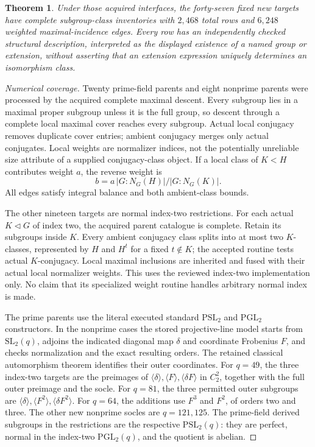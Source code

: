 \documentclass[11pt]{article}
\newtheorem{theorem}{Theorem}\newtheorem{lemma}{Lemma}
\begin{document}
\begin{theorem}
Under those acquired interfaces, the forty-seven fixed new targets have
complete subgroup-class inventories with $2,468$ total rows and $6,248$
weighted maximal-incidence edges. Every row has an independently checked
structural description, interpreted as the displayed existence of a
named group or extension, without asserting that an extension expression
uniquely determines an isomorphism class.
\end{theorem}
\begin{proof}[Numerical coverage]
Twenty prime-field parents and eight nonprime parents were processed by
the acquired complete maximal descent. Every subgroup lies in a maximal
proper subgroup unless it is the full group, so descent through a complete
local maximal cover reaches every subgroup. Actual local conjugacy
removes duplicate cover entries; ambient conjugacy merges only actual
conjugates. Local weights are normalizer indices, not the potentially
unreliable size attribute of a supplied conjugacy-class object. If a local
class of $K<H$ contributes weight $a$, the reverse weight is
\[
 b=a\,|G:N_G(H)|/|G:N_G(K)|.
\]
All edges satisfy integral balance and both ambient-class bounds.

The other nineteen targets are normal index-two restrictions. For each
actual $K\lhd G$ of index two, the acquired parent catalogue is complete.
Retain its subgroups inside $K$. Every ambient conjugacy class splits into
at most two $K$-classes, represented by $H$ and $H^t$ for a fixed
$t\notin K$; the accepted routine tests actual $K$-conjugacy. Local maximal
inclusions are inherited and fused with their actual local normalizer
weights. This uses the reviewed index-two implementation only. No claim
that its specialized weight routine handles arbitrary normal index is made.

The prime parents use the literal executed standard \(\mathrm{PSL}_2\)
and \(\mathrm{PGL}_2\) constructors. In the nonprime cases the stored
projective-line model starts from \(\mathrm{SL}_2(q)\), adjoins the
indicated diagonal map \(\delta\) and coordinate Frobenius \(F\), and
checks normalization and the exact resulting orders. The retained
classical automorphism theorem identifies their outer coordinates.
For \(q=49\), the three index-two targets are the preimages of
\(\langle\delta\rangle,\langle F\rangle,\langle\delta F\rangle\)
in \(C_2^2\), together with the full outer preimage and the socle.
For \(q=81\), the three permitted outer subgroups are
\(\langle\delta\rangle,\langle F^2\rangle,\langle\delta F^2\rangle\).
For \(q=64\), the additions use \(F^3\) and \(F^2\), of orders two
and three. The other new nonprime socles are \(q=121,125\).
The prime-field derived subgroups in the restrictions are the respective
\(\mathrm{PSL}_2(q)\): they are perfect, normal in the index-two
\(\mathrm{PGL}_2(q)\), and the quotient is abelian.


\end{proof}
\end{document}
